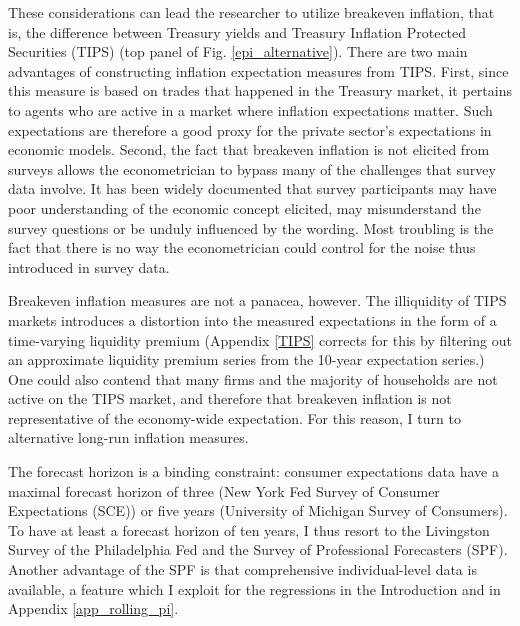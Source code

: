 \documentclass[11pt]{article}
\renewcommand{\[}{\begin{equation}}
\renewcommand{\]}{\end{equation}}
\begin{document}
These considerations can lead the researcher to utilize breakeven inflation, that is, the difference between Treasury yields and Treasury Inflation Protected Securities (TIPS) (top panel of Fig. \ref{epi_alternative}). There are two main advantages of constructing inflation expectation measures from TIPS. First, since this measure is based on trades that happened in the Treasury market, it pertains to agents who are active in a market where inflation expectations matter. Such expectations are therefore a good proxy for the private sector's expectations in economic models. Second, the fact that breakeven inflation is not elicited from surveys allows the econometrician to bypass many of the challenges that survey data involve. It has been widely documented that survey participants may have poor understanding of the economic concept elicited, may misunderstand the survey questions or be unduly influenced by the wording. Most troubling is the fact that there is no way the econometrician could control for the noise thus introduced in survey data. 

Breakeven inflation measures are not a panacea, however. The illiquidity of TIPS markets introduces a distortion into the measured expectations in the form of a time-varying liquidity premium (Appendix \ref{TIPS} corrects for this by filtering out an approximate liquidity premium series from the 10-year expectation series.) One could also contend that many firms and the majority of households are not active on the TIPS market, and therefore that breakeven inflation is not representative of the economy-wide expectation. For this reason, I turn to alternative long-run inflation measures.

The forecast horizon is a binding constraint: consumer expectations data have a maximal forecast horizon of three (New York Fed Survey of Consumer Expectations (SCE)) or five years (University of Michigan Survey of Consumers). To have at least a forecast horizon of ten years, I thus resort to the Livingston Survey of the Philadelphia Fed and the Survey of Professional Forecasters (SPF). Another advantage of the SPF is that comprehensive individual-level data is available, a feature which I exploit for the regressions in the Introduction and in Appendix \ref{app_rolling_pi}. 
\end{document}
